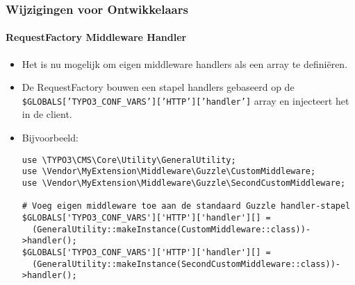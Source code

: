 \begin{frame}[fragile]
	\frametitle{Wijzigingen voor Ontwikkelaars}
	\framesubtitle{RequestFactory Middleware Handler}

	\lstset{basicstyle=\tiny\ttfamily}

	\begin{itemize}
		\item Het is nu mogelijk om eigen middleware handlers als een array te definiëren.
		\item De RequestFactory bouwen een stapel handlers gebaseerd op de\newline
			\small
				\texttt{\$GLOBALS['TYPO3\_CONF\_VARS']['HTTP']['handler']}
			\normalsize
			array en injecteert het in de client.
		\item Bijvoorbeeld:

\begin{lstlisting}
use \TYPO3\CMS\Core\Utility\GeneralUtility;
use \Vendor\MyExtension\Middleware\Guzzle\CustomMiddleware;
use \Vendor\MyExtension\Middleware\Guzzle\SecondCustomMiddleware;

# Voeg eigen middleware toe aan de standaard Guzzle handler-stapel
$GLOBALS['TYPO3_CONF_VARS']['HTTP']['handler'][] =
  (GeneralUtility::makeInstance(CustomMiddleware::class))->handler();
$GLOBALS['TYPO3_CONF_VARS']['HTTP']['handler'][] =
  (GeneralUtility::makeInstance(SecondCustomMiddleware::class))->handler();
\end{lstlisting}

	\end{itemize}

\end{frame}


